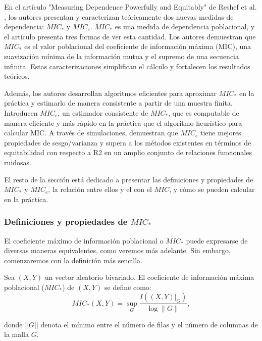         En el art\'iculo "Measuring Dependence Powerfully and Equitably" de Reshef et al. \cite{Reshef2016}, los autores presentan y caracterizan te\'oricamente dos nuevas medidas de dependencia: $MIC_*$ y $MIC_e$. $MIC_*$ es una medida de dependencia poblacional, y el art\' iculo presenta tres formas de ver esta cantidad. Los autores demuestran que $MIC_*$ es el valor poblacional del coeficiente de informaci\'on m\'axima (MIC), una suavizaci\'on m\'inima de la informaci\'on mutua y el supremo de una secuencia infinita. Estas caracterizaciones simplifican el c\'alculo y fortalecen los resultados te\'oricos.
    
        Adem\'as, los autores desarrollan algoritmos eficientes para aproximar $MIC_*$ en la pr\'actica y estimarlo de manera consistente a partir de una muestra finita. Introducen $MIC_e$, un estimador consistente de $MIC_*$, que es computable de manera eficiente y m\'as r\'apido en la pr\'actica que el algoritmo heur\'istico para calcular MIC. A trav\'es de simulaciones, demuestran que $MIC_e$ tiene mejores propiedades de sesgo/varianza y supera a los m\'etodos existentes en t\'erminos de equitabilidad con respecto a R2 en un amplio conjunto de relaciones funcionales ruidosas.

        El resto de la secci\'on est\'a dedicado a presentar las definiciones y propiedades de $MIC_*$ y $MIC_e$, la relaci\'on entre ellos y el con el $MIC$, y c\'omo se pueden calcular en la pr\'actica.
    
        \subsubsection{Definiciones y propiedades de $MIC_*$}
    
        El coeficiente m\'aximo de informaci\'on poblacional o $MIC_*$ puede expresarse de diversas maneras equivalentes, como veremos m\'as adelante. Sin embargo, comenzaremos con la definici\'on m\'as sencilla.
    
        \begin{defn}[$MIC_*$]
            Sea $(X,Y)$ un vector aleatorio bivariado. El coeficiente de informaci\'on m\'axima poblacional ($MIC_*$) de $(X,Y)$ se define como:
            $$
            M I C_*(X, Y)=\sup _G \frac{I\left(\left.(X, Y)\right|_G\right)}{\log \|G\|},
            $$
            
            donde $||G||$ denota el m\'inimo entre el n\'umero de filas y el n\'umero de columnas de la malla $G$.
        \end{defn}
        
